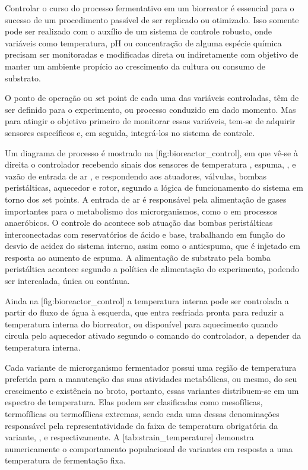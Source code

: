 \startsection[title={Sistema de controle}]
	Controlar o curso do processo fermentativo em um biorreator é essencial para o sucesso de um procedimento passível de ser replicado ou otimizado. Isso somente pode ser realizado com o auxílio de um sistema de controle robusto, onde variáveis como temperatura, pH ou concentração de alguma espécie química precisam ser monitoradas e modificadas direta ou indiretamente com objetivo de manter um ambiente propício ao crescimento da cultura ou consumo de substrato.

	O ponto de operação ou {\emph set point} de cada uma das variáveis controladas, têm de ser definido para o experimento, ou processo conduzido em dado momento. Mas para atingir o objetivo primeiro de monitorar essas variáveis, tem-se de adquirir sensores específicos e, em seguida, integrá-los no sistema de controle.

	\startplacefigure[title={Esquemático de um biorreator fermentativo}, reference={fig:bioreactor_control}]
	\stopplacefigure

	Um diagrama de processo é mostrado na [fig:bioreactor_control], em que vê-se à direita o controlador recebendo sinais dos sensores de temperatura , espuma, ,  e vazão de entrada de ar , e respondendo aos atuadores, válvulas, bombas peristálticas, aquecedor e rotor, segundo a lógica de funcionamento do sistema em torno dos {\emph set points}. A entrada de ar é responsável pela alimentação de gases importantes para o metabolismo dos microrganismos, como o  em processos anaeróbicos. O controle do  acontece sob atuação das bombas peristálticas interconectadas com reservatórios de ácido e base, trabalhando em função do desvio de acidez do sistema interno, assim como o antiespuma, que é injetado em resposta ao aumento de espuma. A alimentação de substrato pela bomba peristáltica acontece segundo a política de alimentação do experimento, podendo ser intercalada, única ou contínua.

	Ainda na [fig:bioreactor_control] a temperatura interna pode ser controlada a partir do fluxo de água à esquerda, que entra resfriada pronta para reduzir a temperatura interna do biorreator, ou disponível para aquecimento quando circula pelo aquecedor ativado segundo o comando do controlador, a depender da temperatura interna.

	Cada variante de microrganismo fermentador possui uma região de temperatura preferida para a manutenção das suas atividades metabólicas, ou mesmo, do seu crescimento e existência no broto, portanto, essas variantes distribuem-se em um espectro de temperatura. Elas podem ser clasificadas como mesofílicas, termofílicas ou termofílicas extremas, sendo cada uma dessas denominações responsável pela representatividade da faixa de temperatura obrigatória da variante, ,  e  \math{\celsius} respectivamente. A [tab:strain_temperature] demonstra numericamente o comportamento populacional de variantes \getbuffer[sacc] em resposta a uma temperatura de fermentação fixa.

